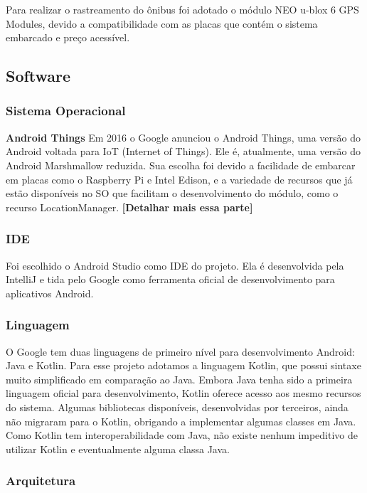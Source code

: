 \documentclass[
	12pt,				%
	oneside,			%
	a4paper,			%
	brazil				%
]{abntex2}
\begin{document}
Para realizar o rastreamento do ônibus foi adotado o módulo NEO u-blox 6 GPS Modules, devido a compatibilidade com as placas que contém o sistema embarcado e preço acessível. 




\subsection{Software}

\subsubsection{Sistema Operacional}

\textbf{Android Things}
Em 2016 o Google anunciou o Android Things, uma versão do Android voltada para IoT (Internet of Things). Ele é, atualmente, uma versão do Android Marshmallow reduzida. Sua escolha foi devido a facilidade de embarcar em placas como o Raspberry Pi e Intel Edison, e a variedade de recursos que já estão disponíveis no SO que facilitam o desenvolvimento do módulo, como o recurso LocationManager. \textbf{[Detalhar mais essa parte]}

\subsubsection{IDE}

Foi escolhido o Android Studio como IDE do projeto. Ela é desenvolvida pela IntelliJ e tida pelo Google como ferramenta oficial de desenvolvimento para aplicativos Android.

\subsubsection{Linguagem}

O Google tem duas linguagens de primeiro nível para desenvolvimento Android: Java e Kotlin. Para esse projeto adotamos a linguagem Kotlin, que possui sintaxe muito simplificado em comparação ao Java. Embora Java tenha sido a primeira linguagem oficial para desenvolvimento, Kotlin oferece acesso aos mesmo recursos do sistema.
Algumas bibliotecas disponíveis, desenvolvidas por terceiros, ainda não migraram para o Kotlin, obrigando a implementar algumas classes em Java. Como Kotlin tem interoperabilidade com Java, não existe nenhum impeditivo de utilizar Kotlin e eventualmente alguma classa Java.

\subsubsection{Arquitetura}
\end{document}
